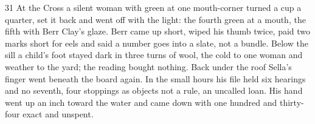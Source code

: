 \begin{CRchronicle}{31}
At the Cross a silent woman with green at one mouth-corner turned a cup a quarter, set it back and went off with the light: the fourth green at a mouth, the fifth with Berr Clay’s glaze. Berr came up short, wiped his thumb twice, paid two marks short for eels and said a number goes into a slate, not a bundle. Below the sill a child’s foot stayed dark in three turns of wool, the cold to one woman and weather to the yard; the reading bought nothing. Back under the roof Sella’s finger went beneath the board again. In the small hours his file held six hearings and no seventh, four stoppings as objects not a rule, an uncalled loan. His hand went up an inch toward the water and came down with one hundred and thirty-four exact and unspent.
\end{CRchronicle}
